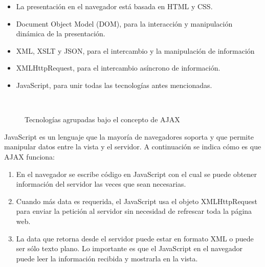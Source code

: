 \begin{itemize}
  \item La presentación en el navegador está basada en HTML y CSS.
  \item Document Object Model (DOM), para la interacción y manipulación dinámica de la presentación.
  \item XML, XSLT y JSON, para el intercambio y la manipulación de información
  \item XMLHttpRequest, para el intercambio asíncrono de información.
  \item JavaScript, para unir todas las tecnologías antes mencionadas.
\end{itemize}
\begin{figure}[h]
  \centering
  \\
  \caption{Tecnologías agrupadas bajo el concepto de AJAX}\label{fig:ajax}
\end{figure}

JavaScript es un lenguaje que la mayoría de navegadores soporta y que permite manipular datos entre la vista y el servidor. A continuación se indica cómo es que AJAX funciona:\cite{ajax_dummies_2006}

\begin{enumerate}
  \item En el navegador se escribe código en JavaScript con el cual se puede obtener información del servidor las veces que sean necesarias.
  \item Cuando más data es requerida, el JavaScript usa el objeto XMLHttpRequest para enviar la petición al servidor sin necesidad de refrescar toda la página web.
  \item La data que retorna desde el servidor puede estar en formato XML o puede ser sólo texto plano. Lo importante es que el JavaScript en el navegador puede leer la información recibida y mostrarla en la vista.
\end{enumerate}


